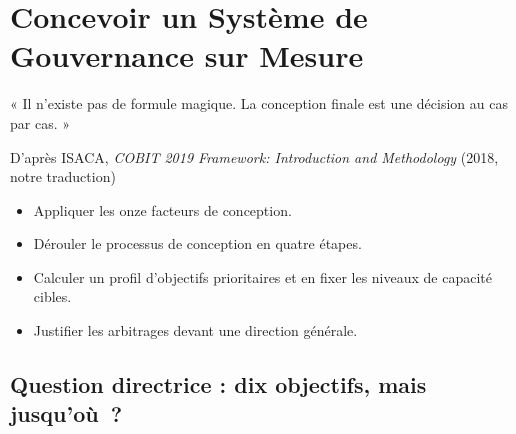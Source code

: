 
\chapter{Concevoir un Système de Gouvernance sur Mesure}
\label{chap:cobit-conception}

\epigraph{%
    « Il n'existe pas de formule magique. La conception finale est une
    décision au cas par cas. »%
}{D'après ISACA, \textit{COBIT 2019 Framework: Introduction and
Methodology} (2018, notre traduction)}


\begin{boxobjectifs}
\begin{itemize}
    \item Appliquer les onze facteurs de conception.
    \item Dérouler le processus de conception en quatre étapes.
    \item Calculer un profil d'objectifs prioritaires et en fixer les
          niveaux de capacité cibles.
    \item Justifier les arbitrages devant une direction générale.
\end{itemize}
\end{boxobjectifs}

\bigskip

\section*{Question directrice : dix objectifs, mais jusqu'où~?}


